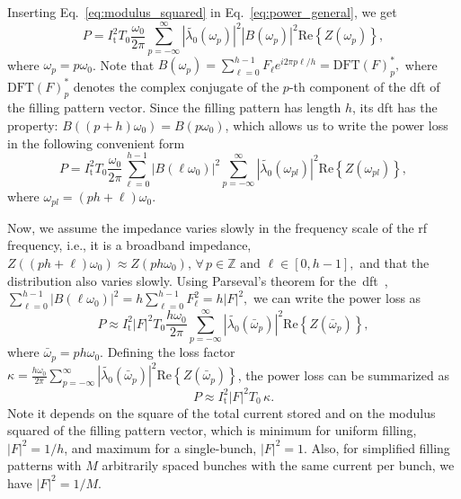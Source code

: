 \documentclass
[
    a4paper,
    nospread,     %
]{jacow}
\providecommand{\Real}[1]{\ensuremath{\mathrm{Re}\left\{#1\right\}}}
\begin{document}
    Inserting Eq.~\eqref{eq:modulus_squared} in Eq.~\eqref{eq:power_general}, we get
    \begin{equation}
        P = I_\mathrm{t}^2T_0 \frac{\omega_0}{2\pi}\sum_{p=-\infty}^{\infty} \left|\tilde{\lambda_0}(\omega_p)\right|^2 \left|B(\omega_p)\right|^2\Real{Z(\omega_p)},
    \end{equation}
    where $\omega_p = p\omega_0$. Note that
    $
        B(\omega_p) = \sum_{\ell=0}^{h-1}F_\ell e^{i2\pi p\ell/h} = \mathrm{DFT}(F)^*_p,
    $
    where $\mathrm{DFT}(F)^*_p$ denotes the complex conjugate of the $p$-th component of the \gls{dft} of the filling pattern vector. Since the filling pattern has length $h$, its \gls{dft} has the property:
    $
        B((p+h)\omega_0) = B(p\omega_0)
    $,
    which allows us to write the power loss in the following convenient form
    \begin{equation}
        P = I_\mathrm{t}^2T_0 \frac{\omega_0}{2\pi}\sum_{\ell=0}^{h-1} \left|B(\ell\omega_0)\right|^2\sum_{p=-\infty}^{\infty} \left|\tilde{\lambda_0}(\omega_{pl})\right|^2 \Real{Z(\omega_{pl})},
    \end{equation}
    where $\omega_{pl} = (ph+\ell)\omega_0$.
    
    Now, we assume the impedance varies slowly in the frequency scale of the rf frequency, i.e., it is a broadband impedance,
    $
        Z((ph+\ell)\omega_0) \approx Z(ph\omega_0), \, \forall\, p \in\mathbb{Z}\,\,\mathrm{and}\,\, \ell \in[0,h-1],
    $
    and that the distribution also varies slowly. Using Parseval's theorem for the~\gls{dft}~\cite{Wikipedia_DFT},
    $
        \sum_{\ell=0}^{h-1} \left|B(\ell\omega_0)\right|^2 = h\sum_{\ell=0}^{h-1} F_\ell^2 = h|F|^2,
    $
    we can write the power loss as
    \begin{equation}
        P \approx I_\mathrm{t}^2 \left|F\right|^2 T_0 \frac{h\omega_0}{2\pi}\sum_{p=-\infty}^{\infty} \left|\tilde{\lambda_0}(\bar{\omega}_p)\right|^2 \Real{Z(\bar{\omega}_p)},
    \end{equation}
    where $\bar{\omega}_p = ph\omega_0$. Defining the loss factor
    $
        \kappa = \frac{h\omega_0}{2\pi}\sum_{p=-\infty}^{\infty} \left|\tilde{\lambda_0}(\bar{\omega}_p)\right|^2 \Real{Z(\bar{\omega}_p)}
    $,
    the power loss can be summarized as
    \begin{equation}\label{eq:power_broadband}
        P \approx I_\mathrm{t}^2 \left|F\right|^2 T_0\, \kappa.
    \end{equation}
    Note it depends on the square of the total current stored and on the modulus squared of the filling pattern vector, which is minimum for uniform filling, $|F|^2=1/h$, and maximum for a single-bunch, $|F|^2=1$. Also, for simplified filling patterns with $M$ arbitrarily spaced bunches with the same current per bunch, we have $|F|^2=1/M$.
\end{document}
